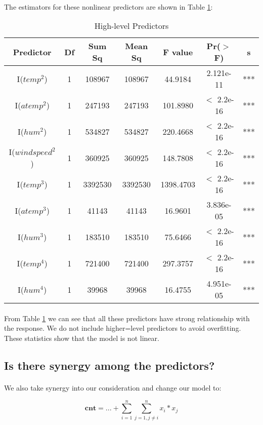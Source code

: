 \documentclass{article}[]
\begin{document}
\paragraph{}
The estimators for these nonlinear predictors are shown in Table \ref{table:high-level_predictors}: 
\begin{table}
\caption{High-level Predictors}
\centering
\begin{tabular}{c|c|c|c|c|c|c}
\hline
{\bf Predictor}&{\bf Df}&{\bf Sum Sq}&{\bf Mean Sq}&{\bf F value}&{\bf Pr($>$ F)}&{\bf s}\\
\hline
I(${temp}^2$)             &1    &108967   &108967    &44.9184 &2.121e-11 &***\\
I($atemp^2$)            &1    &247193   &247193   &101.8980 &$<$ 2.2e-16 &***\\
I($hum^2$)              &1    &534827   &534827   &220.4668 &$<$ 2.2e-16 &***\\
I($windspeed^2$)        &1    &360925   &360925   &148.7808 &$<$ 2.2e-16 &***\\
I($temp^3$)             &1   &3392530  &3392530  &1398.4703 &$<$ 2.2e-16 &***\\
I($atemp^3$)            &1     &41143    &41143    &16.9601 &3.836e-05 &***\\
I($hum^3$)              &1    &183510   &183510    &75.6466 &$<$ 2.2e-16 &***\\
I($temp^4$)             &1    &721400   &721400   &297.3757 &$<$ 2.2e-16 &***\\
I($hum^4$)              &1     &39968    &39968    &16.4755 &4.951e-05 &***\\
\hline
\end{tabular}
\label{table:high-level_predictors}
\end{table}
\paragraph{}
From Table \ref{table:high-level_predictors} we can see that all these predictors have strong relationship with the response. We do not include higher=level predictors to avoid overfitting. These statistics show that the model is not linear.

\subsection{Is there synergy among the predictors?}
\paragraph{}
We also take synergy into our consideration and change our model to:
\begin{center}
$$\textbf{cnt} = ...+\sum_{i=1}^n \sum_{j=1, j\not=i}^n {x}_i*{x}_j$$
\end{center}
\end{document}

